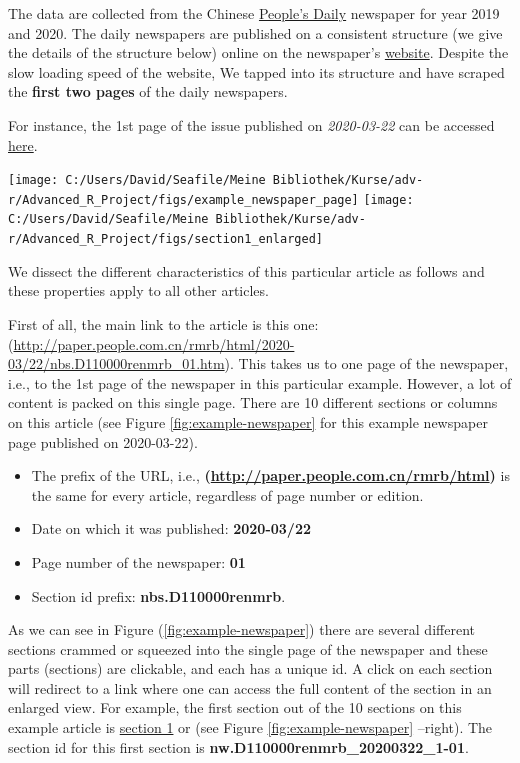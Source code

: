 \documentclass[12pt,a4paper]{article}
\let\origfigure\figure
\let\endorigfigure\endfigure
\renewenvironment{figure}[1][2] {
    \expandafter\origfigure\expandafter[H]
} {
    \endorigfigure
}
\begin{document}
The data are collected from the Chinese \href{https://en.wikipedia.org/wiki/People\%27s_Daily}{People's Daily} newspaper for year 2019 and 2020. The daily newspapers are published on a consistent structure (we give the details of the structure below) online on the newspaper's \href{paper.people.com.cn}{website}. Despite the slow loading speed of the website, We tapped into its structure and have scraped the \textbf{first two pages} of the daily newspapers.

For instance, the 1st page of the issue published on \emph{2020-03-22} can be accessed \href{http://paper.people.com.cn/rmrb/html/2020-03/22/nbs.D110000renmrb_01.htm}{here}.

\begin{figure}
\texttt{[image: C:/Users/David/Seafile/Meine Bibliothek/Kurse/adv-r/Advanced\_R\_Project/figs/example\_newspaper\_page]} \texttt{[image: C:/Users/David/Seafile/Meine Bibliothek/Kurse/adv-r/Advanced\_R\_Project/figs/section1\_enlarged]} \caption{Example newspaper page published on 2020-03-22 (left), and Section or column 1 of it enlarged (right).}\label{fig:example-newspaper}
\end{figure}

We dissect the different characteristics of this particular article as follows and these properties apply to all other articles.

First of all, the main link to the article is this one: (\url{http://paper.people.com.cn/rmrb/html/2020-03/22/nbs.D110000renmrb_01.htm}). This takes us to one page of the newspaper, i.e., to the 1st page of the newspaper in this particular example. However, a lot of content is packed on this single page. There are 10 different sections or columns on this article (see Figure \ref{fig:example-newspaper} for this example newspaper page published on 2020-03-22).

\begin{itemize}
\item
  The prefix of the URL, i.e.,
  \textbf{(\url{http://paper.people.com.cn/rmrb/html})} is the same for every article, regardless of page number or edition.
\item
  Date on which it was published: \textbf{2020-03/22}
\item
  Page number of the newspaper: \textbf{01}
\item
  Section id prefix: \textbf{nbs.D110000renmrb}.
\end{itemize}

As we can see in Figure (\ref{fig:example-newspaper}) there are several different sections crammed or squeezed into the single page of the newspaper and these parts (sections) are clickable, and each has a unique id. A click on each section will redirect to a link where one can access the full content of the section in an enlarged view. For example, the first section out of the 10 sections on this example article is \href{http://paper.people.com.cn/rmrb/html/2020-03/22/nw.D110000renmrb_20200322_1-01.htm}{section 1} or (see Figure \ref{fig:example-newspaper} --right). The section id for this first section is \textbf{nw.D110000renmrb\_20200322\_1-01}.
\end{document}
